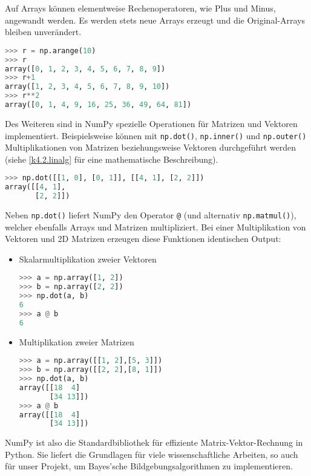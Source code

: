 Auf Arrays können elementweise Rechenoperatoren, wie Plus und Minus, angewandt werden. Es werden stets neue Arrays erzeugt und die Original-Arrays bleiben unverändert.

\begin{lstlisting}[language=python]
>>> r = np.arange(10)
>>> r
array([0, 1, 2, 3, 4, 5, 6, 7, 8, 9])
>>> r+1
array([1, 2, 3, 4, 5, 6, 7, 8, 9, 10])
>>> r**2
array([0, 1, 4, 9, 16, 25, 36, 49, 64, 81])
\end{lstlisting}

Des Weiteren sind in NumPy spezielle Operationen für Matrizen und Vektoren implementiert. Beispielsweise können mit \verb|np.dot()|, \verb|np.inner()| und \verb|np.outer()| Multiplikationen von Matrizen beziehungsweise Vektoren durchgeführt werden (siehe \cref{k4.2.linalg} für eine mathematische Beschreibung).

\begin{lstlisting}[language=python]
>>> np.dot([[1, 0], [0, 1]], [[4, 1], [2, 2]])
array([[4, 1],
       [2, 2]])
\end{lstlisting}

Neben \verb|np.dot()| liefert NumPy den Operator \verb|@| (und alternativ \verb|np.matmul()|), welcher ebenfalls Arrays und Matrizen multipliziert.
Bei einer Multiplikation von Vektoren und 2D Matrizen erzeugen diese Funktionen identischen Output:

\begin{itemize}
    \item Skalarmultiplikation zweier Vektoren

        \begin{lstlisting}[language=python]
>>> a = np.array([1, 2])
>>> b = np.array([2, 2])
>>> np.dot(a, b)
6
>>> a @ b
6
\end{lstlisting}

  \item Multiplikation zweier Matrizen

        \begin{lstlisting}[language=python]
>>> a = np.array([[1, 2],[5, 3]])
>>> b = np.array([[2, 2],[8, 1]])
>>> np.dot(a, b)
array([[18  4]
       [34 13]])
>>> a @ b
array([[18  4]
       [34 13]])
\end{lstlisting}

\end{itemize}

NumPy ist also die Standardbibliothek für effiziente Matrix-Vektor-Rechnung in Python. Sie liefert die Grundlagen für viele wissenschaftliche Arbeiten, so auch für unser Projekt, um Bayes'sche Bildgebungsalgorithmen zu implementieren.
